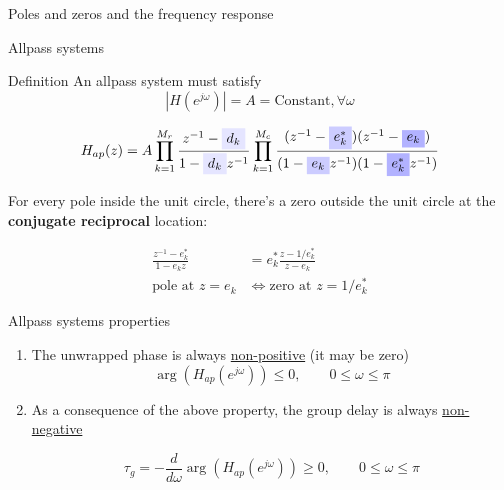 \documentclass[10pt]{beamer}
\begin{document}
\begin{frame}{Poles and zeros and the frequency response}

\end{frame}

\begin{frame}{Allpass systems}

\begin{block}{Definition}
	An allpass system must satisfy
	\begin{equation*}
	|H(e^{j\omega})| = A = \text{Constant}, \forall \omega
	\end{equation*}
\end{block}

\begin{align*}
H_{ap}(z) = A\prod_{k = 1}^{M_r}\frac{z^{-1} - \tikz[baseline]{\node[fill=blue!10,anchor=base] {$d_k$};}}{1 - \tikz[baseline]{\node[fill=blue!10,anchor=base] {$d_k$};}z^{-1}}\prod_{k = 1}^{M_c}\frac{(z^{-1} - \tikz[baseline]{\node[fill=blue!20,anchor=base] {$e^*_k$};})(z^{-1} - \tikz[baseline]{\node[fill=blue!30,anchor=base] {$e_k$};})}{(1 - \tikz[baseline]{\node[fill=blue!20,anchor=base] {$e_k$};}z^{-1})(1 - \tikz[baseline]{\node[fill=blue!30,anchor=base] {$e^*_k$};}z^{-1})}
\end{align*}

For every pole inside the unit circle, there's a zero outside the unit circle at the \textbf{conjugate reciprocal} location:

\begin{align*}
\frac{z^{-1} - e_k^*}{1 - e_kz} &= e_k^*\frac{z - 1/e_k^*}{z - e_k}\\
\text{pole at $z = e_k$} &\Longleftrightarrow \text{zero at $z = 1/e_k^*$}
\end{align*}

\end{frame}

\begin{frame}{Allpass systems properties}
\begin{enumerate}
	\item The unwrapped phase is always \underline{non-positive} (it may be zero)
	\begin{equation*}
	\arg(H_{ap}(e^{j\omega})) \leq 0, \qquad 0 \leq \omega\leq\pi
	\end{equation*}
	\item As a consequence of the above property, the group delay is always \underline{non-negative}
	
	\begin{equation*}
	\tau_g = -\dfrac{d}{d\omega}\arg(H_{ap}(e^{j\omega})) \geq 0, \qquad 0 \leq \omega\leq\pi
	\end{equation*} 
	
\end{enumerate}
\end{frame}
\end{document}
